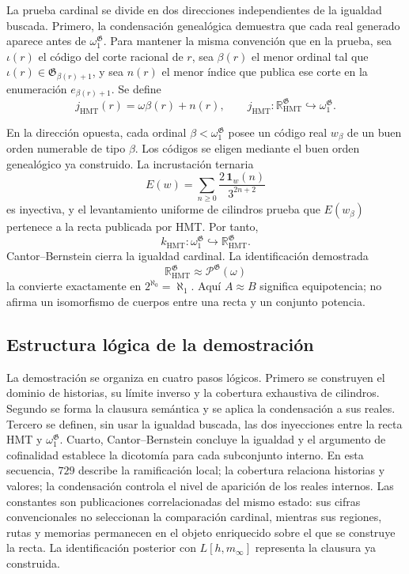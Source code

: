 La prueba cardinal se divide en dos direcciones independientes de la igualdad
buscada. Primero, la condensación genealógica demuestra que cada real generado
aparece antes de \(\omega_1^{\mathfrak G}\). Para mantener la misma
convención que en la prueba, sea \(\iota(r)\) el código del corte racional
de \(r\), sea \(\beta(r)\) el menor ordinal tal que
\(\iota(r)\in\mathfrak G_{\beta(r)+1}\), y sea \(n(r)\) el menor índice
que publica ese corte en la enumeración \(e_{\beta(r)+1}\). Se define
\[
 j_{\mathrm{HMT}}(r)=\omega\beta(r)+n(r),
 \qquad
 j_{\mathrm{HMT}}:
 \mathbb R_{\mathrm{HMT}}^{\mathfrak G}
 \hookrightarrow\omega_1^{\mathfrak G}.
\]

En la dirección opuesta, cada ordinal
\(\beta<\omega_1^{\mathfrak G}\) posee un código real \(w_\beta\) de un buen
orden numerable de tipo \(\beta\). Los códigos se eligen mediante el buen
orden genealógico ya construido. La incrustación ternaria
\[
 E(w)=\sum_{n\geq0}\frac{2\,\mathbf 1_w(n)}{3^{2n+2}}
\]
es inyectiva, y el levantamiento uniforme de cilindros prueba que
\(E(w_\beta)\) pertenece a la recta publicada por HMT. Por tanto,
\[
 k_{\mathrm{HMT}}:
 \omega_1^{\mathfrak G}
 \hookrightarrow\mathbb R_{\mathrm{HMT}}^{\mathfrak G}.
\]
Cantor--Bernstein cierra la igualdad cardinal. La identificación demostrada
\[
 \mathbb R_{\mathrm{HMT}}^{\mathfrak G}
 \approx\mathcal P^{\mathfrak G}(\omega)
\]
la convierte exactamente en \(2^{\aleph_0}=\aleph_1\). Aquí
\(A\approx B\) significa equipotencia; no afirma un isomorfismo de cuerpos
entre una recta y un conjunto potencia.

\subsection{Estructura lógica de la demostración}

La demostración se organiza en cuatro pasos lógicos. Primero se construyen el
dominio de historias, su límite inverso y la cobertura exhaustiva de cilindros.
Segundo se forma la clausura semántica y se aplica la condensación a sus reales.
Tercero se definen, sin usar la igualdad buscada, las dos inyecciones entre la
recta HMT y \(\omega_1^{\mathfrak G}\). Cuarto, Cantor--Bernstein concluye la
igualdad y el argumento de cofinalidad establece la dicotomía para cada
subconjunto interno. En esta secuencia, \(729\) describe la ramificación local;
la cobertura relaciona historias y valores; la condensación controla el nivel
de aparición de los reales internos. Las constantes son publicaciones
correlacionadas del mismo estado: sus cifras convencionales no seleccionan la
comparación cardinal, mientras sus regiones, rutas y memorias permanecen en el
objeto enriquecido sobre el que se construye la recta. La
identificación posterior con \(L[h,m_\infty]\) representa la clausura ya
construida.

